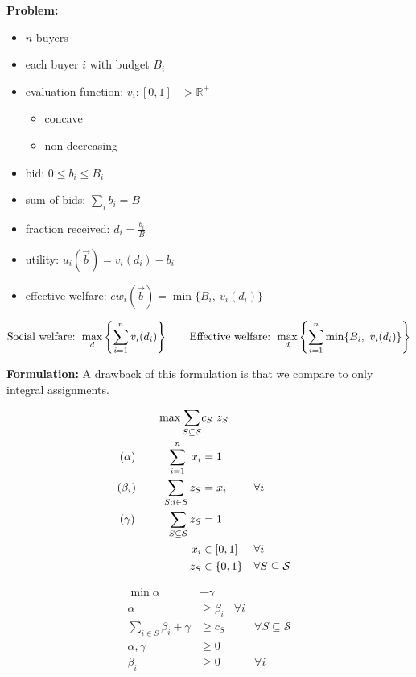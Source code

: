 \documentclass[11pt,a4paper]{article}
\begin{document}
\textbf{Problem:}

\begin{itemize}
    \item $n$ buyers
    \item each buyer $i$ with budget $B_i$
    \item evaluation function: $v_i : [0,1] -> \mathbb{R}^+$
    \begin{itemize}
        \item concave
        \item non-decreasing
    \end{itemize}
    \item bid: $0 \le b_i \le B_i$
    \item sum of bids: $\sum_i b_i = B$
    \item fraction received: $d_i = \frac{b_i}{B}$
    \item utility: $u_i(\vec{b}) = v_i(d_i) - b_i$
    \item effective welfare: $ew_i(\vec{b}) = \min\{B_i,\ v_i(d_i)\}$
\end{itemize}

\[
    \textnormal{Social welfare: } \max_{d} \left\{\sum_{i=1}^{n}  v_i(d_i) \right\} \qquad \textnormal{Effective welfare: } \max_{d} \left\{\sum_{i=1}^{n}  \min\{B_i,\ v_i(d_i)\} \right\}
\]

\vspace{1cm}
\textbf{Formulation:}
A drawback of this formulation is that we compare to only integral assignments. 

\begin{minipage}[t]{0.59\textwidth}
	\begin{align*}
		\max  \sum_{S \subseteq \mathcal{S}} &c_{S}\ z_{S} \\
		(\alpha) \hspace{1cm} \sum_{i=1}^{n} \ x_{i} &= 1 & &  \\
		(\beta_i) \hspace{0.82cm} \sum_{S: i \in S} z_{S}  &= x_{i}	& & \forall i \\
		(\gamma) \hspace{1cm} \sum_{S \subseteq \mathcal{S}} z_{S} &= 1 & & \\
		x_{i} &\in [0,1] & & \forall i\\
		z_{S} &\in \{0,1\} & & \forall S \subseteq \mathcal{S}\\
	\end{align*}
\end{minipage}
\begin{minipage}[t]{0.3\textwidth}
	\begin{align*}
		\min \alpha &+ \gamma \\
		\alpha &\ge \beta_i  &  \forall i \\
		\sum_{i \in S} \beta_{i} + \gamma &\ge c_{S}  & & \forall S \subseteq \mathcal{S}\\
		\alpha, \gamma &\geq 0 & & \\
		\beta_i &\geq 0 & & \forall i
\end{align*}
\end{minipage}
\end{document}
